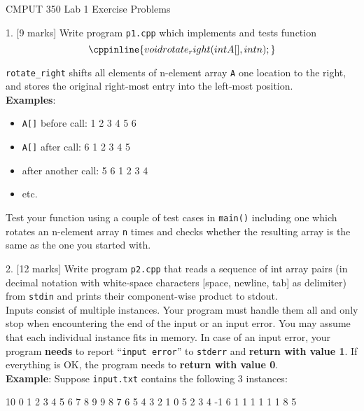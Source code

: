 \documentclass[a4paper,11pt]{article}
\begin{document}

\begin{center}
{\Large CMPUT 350 Lab 1 Exercise Problems}
\end{center}


1. [9 marks] Write {\CC} program \texttt{p1.cpp} which implements and tests function
\[ \cppinline{void rotate_right(int A[], int n);} \]

\texttt{rotate\_right} shifts all elements of n-element array \texttt{A} one location to the right, 
and stores the original right-most entry into the left-most position. \\

\textbf{Examples}:
\begin{itemize}
    \item \texttt{A[]} before call:    1 2 3 4 5 6
    \item \texttt{A[]} after call:     6 1 2 3 4 5
    \item after another call: 5 6 1 2 3 4
    \item etc.
\end{itemize}

Test your function using a couple of test cases in \texttt{main()} including one which
rotates an n-element array \texttt{n} times and checks whether the resulting array is
the same as the one you started with.
 
\linerule

\newpage

2. [12 marks] Write {\CC} program \texttt{p2.cpp} that reads a sequence of int array pairs 
(in decimal notation with white-space characters [space, newline, tab] as delimiter) from
\texttt{stdin} and prints their component-wise product to stdout. \\

Inputs consist of multiple instances. Your program must handle them all and
only stop when encountering the end of the input or an input error. 
You may assume that each individual instance fits in memory. 
In case of an input error, your program \textbf{needs} to report ``\texttt{input error}'' to
\texttt{stderr} and \textbf{return with value 1}. 
If everything is OK, the program needs to \textbf{return with value 0}. \\

\textbf{Example}: Suppose \texttt{input.txt} contains the following 3 instances:
\begin{cppcode}
10
0 1 2 3 4 5 6 7 8 9
9 8 7 6 5 4 3 2 1 0
5
2 3 4 -1 6
1 1 1 1 1
1
8
5
\end{cppcode}
\end{document}
